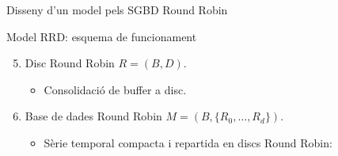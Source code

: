 \begin{frame}{Disseny d'un model pels SGBD Round Robin}
\begin{textblock*}{50mm}


\end{textblock*}



\end{frame}


\begin{frame}{Model RRD: esquema de funcionament}

\begin{enumerate}
\setcounter{enumi}{4}
\item Disc Round Robin $R=(B,D)$. 
\begin{itemize}
\item Consolidació de buffer a disc.
\end{itemize}
\item Base de dades Round Robin $M=(B,\{R_0,\ldots,R_d \})$. 
\begin{itemize}
\item Sèrie temporal compacta i repartida en discs Round Robin:
\end{itemize}
\end{enumerate}




\begin{center}
       \tiny
       \setlength{\unitlength}{0.2mm}
       
       \normalsize
\end{center}






\end{frame}



